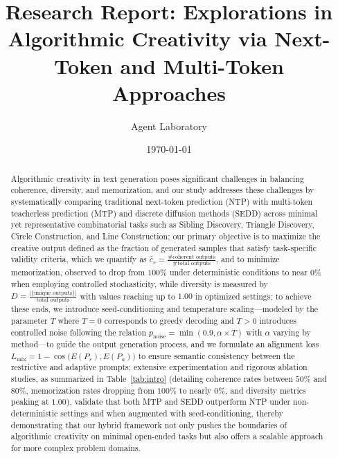 \documentclass{article} %
\title{Research Report: Explorations in Algorithmic Creativity via Next-Token and Multi-Token Approaches}
\author{Agent Laboratory}
\date{\today}
\begin{document}
\maketitle

\begin{abstract}
Algorithmic creativity in text generation poses significant challenges in balancing coherence, diversity, and memorization, and our study addresses these challenges by systematically comparing traditional next-token prediction (NTP) with multi-token teacherless prediction (MTP) and discrete diffusion methods (SEDD) across minimal yet representative combinatorial tasks such as Sibling Discovery, Triangle Discovery, Circle Construction, and Line Construction; our primary objective is to maximize the creative output defined as the fraction of generated samples that satisfy task-specific validity criteria, which we quantify as \(\hat{c}_r = \frac{\# \text{coherent outputs}}{\# \text{total outputs}}\), and to minimize memorization, observed to drop from \(100\%\) under deterministic conditions to near \(0\%\) when employing controlled stochasticity, while diversity is measured by \(D = \frac{|\{ \text{unique outputs} \}|}{\text{total outputs}}\) with values reaching up to \(1.00\) in optimized settings; to achieve these ends, we introduce seed-conditioning and temperature scaling—modeled by the parameter \(T\) where \(T=0\) corresponds to greedy decoding and \(T>0\) introduces controlled noise following the relation \(p_{\text{noise}} = \min(0.9, \alpha \times T)\) with \(\alpha\) varying by method—to guide the output generation process, and we formulate an alignment loss \(L_{\text{mix}} = 1 - \cos\Big(E(P_r), E(P_a)\Big)\) to ensure semantic consistency between the restrictive and adaptive prompts; extensive experimentation and rigorous ablation studies, as summarized in Table~\ref{tab:intro} (detailing coherence rates between \(50\%\) and \(80\%\), memorization rates dropping from \(100\%\) to nearly \(0\%\), and diversity metrics peaking at \(1.00\)), validate that both MTP and SEDD outperform NTP under non-deterministic settings and when augmented with seed-conditioning, thereby demonstrating that our hybrid framework not only pushes the boundaries of algorithmic creativity on minimal open-ended tasks but also offers a scalable approach for more complex problem domains.
\end{abstract}
\end{document}
